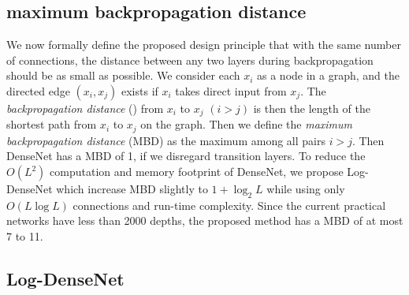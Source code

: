 \documentclass{article}
\newcommand{\concat}{\text{concat}}
\newcommand{\logdense}{Log-DenseNet\xspace}
\newcommand{\pbdfull}{maximum backpropagation distance\xspace}
\newcommand{\pbd}{MBD\xspace}
\newcommand{\bd}{\text{BD}\xspace}
\newcommand{\allienote}[1]{\textcolor{blue}{#1}}
\begin{document}


\subsection{\pbdfull}
\label{sec:pbd}
We now formally define the proposed design principle that with the same number of connections, the distance between any two layers during backpropagation should be as small as possible. We consider each $x_i$ as a node in a graph, and the directed edge $(x_i, x_j)$ exists if $x_i$ takes direct input from $x_j$. The \textit{backpropagation distance} (\bd) from $x_i$ to $x_j$ $(i > j)$ is then the length of the shortest path from $x_i$ to $x_j$ on the graph. Then we define the \textit{\pbdfull} (\pbd) as the maximum \bd among all pairs $i > j$. Then DenseNet has a \pbd of 1, if we disregard transition layers. To reduce the $O(L^2)$ computation and memory footprint of DenseNet, we propose \logdense which increase \pbd slightly to $1+\log_2 L$ while using only $O(L \log L)$ connections and run-time complexity. Since the current practical networks have less than 2000 depths, the proposed method has a \pbd of at most 7 to 11.


\subsection{\logdense}
\label{sec:logdense}
\end{document}
